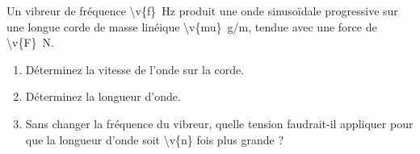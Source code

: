 Un vibreur de fréquence \qty{\v{f}}{Hz} produit une onde sinusoïdale progressive sur une longue corde de masse linéique \qty{\v{mu}}{g/m}, tendue avec une force de \qty{\v{F}}{N}.

\begin{enumerate}[label=\alph*)]
    \item Déterminez la vitesse de l'onde sur la corde.
    \item Déterminez la longueur d'onde.
    \item Sans changer la fréquence du vibreur, quelle tension faudrait-il appliquer pour que la longueur d'onde soit \num{\v{n}} fois plus grande ?
\end{enumerate}
